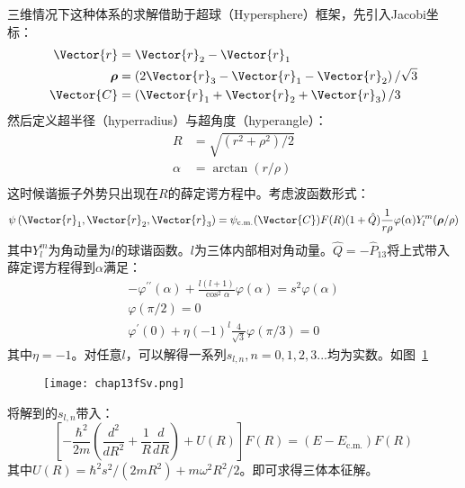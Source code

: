 三维情况下这种体系的求解\cite{Fleix2006prlunitary3b}借助于超球（Hypersphere）框架，先引入Jacobi坐标：
\begin{equation}
\begin{split}
\Vector{r}&=\Vector{r}_{2}-\Vector{r}_{1}\\
\boldsymbol{\rho}&=\left(2 \Vector{r}_{3}-\Vector{r}_{1}-\Vector{r}_{2}\right) / \sqrt{3}\\
\Vector{C}&=\left(\Vector{r}_{1}+\Vector{r}_{2}+\Vector{r}_{3}\right) / 3\\
\end{split}
\end{equation}
然后定义超半径（hyperradius）与超角度（hyperangle）：
\begin{equation}
\begin{split}
R&=\sqrt{\left(r^{2}+\rho^{2}\right) / 2}\\
\alpha&=\arctan (r / \rho)\\
\end{split}
\end{equation}
这时候谐振子外势只出现在$R$的薛定谔方程中。考虑波函数形式：
\begin{equation}
\psi\left(\Vector{r}_{1}, \Vector{r}_{2}, \Vector{r}_{3}\right)=\psi_{\mathrm{c} . \mathrm{m} .}(\Vector{C}) F(R)(1+\hat{Q}) \frac{1}{r \rho} \varphi(\alpha) Y_{l}^{m}(\boldsymbol{\rho} / \rho)
\end{equation}
其中$Y_l^m$为角动量为$l$的球谐函数。$l$为三体内部相对角动量。$\hat{Q}=-\hat{P}_{13}$将上式带入薛定谔方程得到$\alpha$满足：
\begin{equation}
\begin{gathered}
-\varphi^{\prime \prime}(\alpha)+\frac{l(l+1)}{\cos ^{2} \alpha} \varphi(\alpha)=s^{2} \varphi(\alpha) \\
\varphi(\pi / 2)=0 \\
\varphi^{\prime}(0)+\eta(-1)^{l} \frac{4}{\sqrt{3}} \varphi(\pi / 3)=0
\end{gathered}
\end{equation}
其中$\eta=-1$。对任意$l$，可以解得一系列$s_{l,n},n=0,1,2,3...$均为实数。如图~\ref{Sv}~
\begin{figure}[!htbp]
    \centering
    \texttt{[image: chap13fSv.png]}
    \label{Sv}
\end{figure}
将解到的$s_{l,n}$带入：
\begin{equation}
\left[-\frac{\hbar^{2}}{2 m}\left(\frac{d^{2}}{d R^{2}}+\frac{1}{R} \frac{d}{d R}\right)+U(R)\right] F(R)=\left(E-E_{\mathrm{c} . \mathrm{m} .}\right) F(R)
\end{equation}
其中$U(R)=\hbar^{2} s^{2} /\left(2 m R^{2}\right)+m \omega^{2} R^{2} / 2$。即可求得三体本征解。

